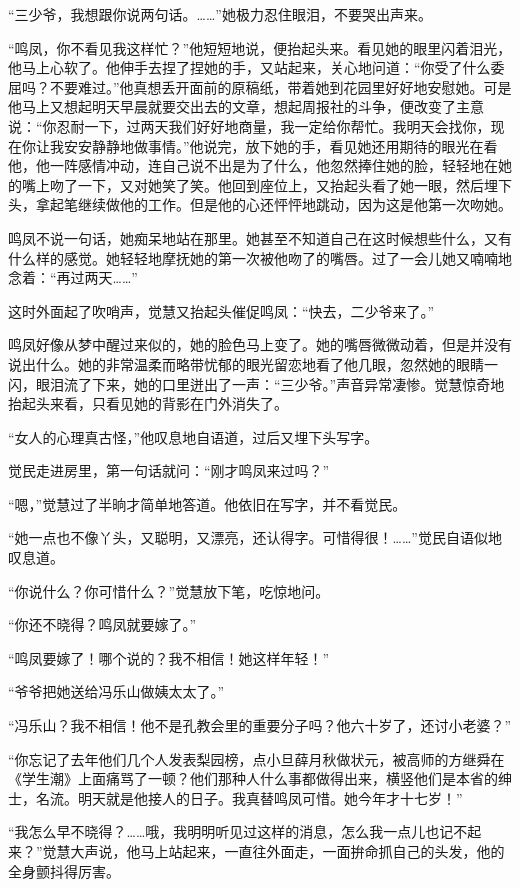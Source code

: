 \par “三少爷，我想跟你说两句话。……”她极力忍住眼泪，不要哭出声来。
\par “鸣凤，你不看见我这样忙？”他短短地说，便抬起头来。看见她的眼里闪着泪光，他马上心软了。他伸手去捏了捏她的手，又站起来，关心地问道：“你受了什么委屈吗？不要难过。”他真想丢开面前的原稿纸，带着她到花园里好好地安慰她。可是他马上又想起明天早晨就要交出去的文章，想起周报社的斗争，便改变了主意说：“你忍耐一下，过两天我们好好地商量，我一定给你帮忙。我明天会找你，现在你让我安安静静地做事情。”他说完，放下她的手，看见她还用期待的眼光在看他，他一阵感情冲动，连自己说不出是为了什么，他忽然捧住她的脸，轻轻地在她的嘴上吻了一下，又对她笑了笑。他回到座位上，又抬起头看了她一眼，然后埋下头，拿起笔继续做他的工作。但是他的心还怦怦地跳动，因为这是他第一次吻她。
\par 鸣凤不说一句话，她痴呆地站在那里。她甚至不知道自己在这时候想些什么，又有什么样的感觉。她轻轻地摩抚她的第一次被他吻了的嘴唇。过了一会儿她又喃喃地念着：“再过两天……”
\par 这时外面起了吹哨声，觉慧又抬起头催促鸣凤：“快去，二少爷来了。”
\par 鸣凤好像从梦中醒过来似的，她的脸色马上变了。她的嘴唇微微动着，但是并没有说出什么。她的非常温柔而略带忧郁的眼光留恋地看了他几眼，忽然她的眼睛一闪，眼泪流了下来，她的口里迸出了一声：“三少爷。”声音异常凄惨。觉慧惊奇地抬起头来看，只看见她的背影在门外消失了。
\par “女人的心理真古怪，”他叹息地自语道，过后又埋下头写字。
\par 觉民走进房里，第一句话就问：“刚才鸣凤来过吗？”
\par “嗯，”觉慧过了半晌才简单地答道。他依旧在写字，并不看觉民。
\par “她一点也不像丫头，又聪明，又漂亮，还认得字。可惜得很！……”觉民自语似地叹息道。
\par “你说什么？你可惜什么？”觉慧放下笔，吃惊地问。
\par “你还不晓得？鸣凤就要嫁了。”
\par “鸣凤要嫁了！哪个说的？我不相信！她这样年轻！”
\par “爷爷把她送给冯乐山做姨太太了。”
\par “冯乐山？我不相信！他不是孔教会里的重要分子吗？他六十岁了，还讨小老婆？”
\par “你忘记了去年他们几个人发表梨园榜，点小旦薛月秋做状元，被高师的方继舜在《学生潮》上面痛骂了一顿？他们那种人什么事都做得出来，横竖他们是本省的绅士，名流。明天就是他接人的日子。我真替鸣凤可惜。她今年才十七岁！”
\par “我怎么早不晓得？……哦，我明明听见过这样的消息，怎么我一点儿也记不起来？”觉慧大声说，他马上站起来，一直往外面走，一面拚命抓自己的头发，他的全身颤抖得厉害。
